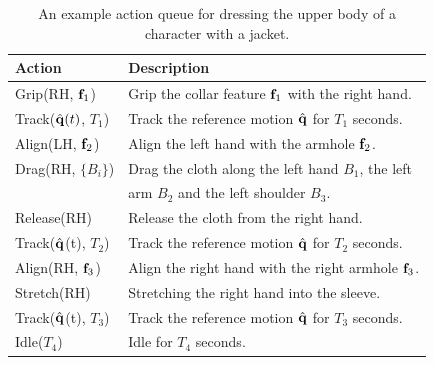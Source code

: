 \begin{table}
  \centering
  \begin{tabular}{|l|l|}
    \hline
    Action & Description \\
    \hline
    Grip(RH, $\mathbf{f}_{1}$) & Grip the collar feature $\mathbf{f}_1$  with the right hand.\\
    Track($\hat{\mathbf{q}}(t)$, $T_1$) & Track the reference motion $\hat{\mathbf{q}}$ for $T_1$ seconds.\\
    Align(LH, $\mathbf{f}_{2}$) & Align the left hand with the armhole $\mathbf{f}_2$.\\
    Drag(RH, $\{B_i\}$) & Drag the cloth along the left hand $B_1$, the left\\
    &                      arm $B_2$ and the left shoulder $B_3$.\\
    Release(RH) & Release the cloth from the right hand.\\
    Track($\hat{\mathbf{q}}$(t), $T_2$) & Track the reference motion $\hat{\mathbf{q}}$ for $T_2$ seconds.\\
    Align(RH, $\mathbf{f}_{3}$) & Align the right hand with the right armhole $\mathbf{f}_3$.\\
    Stretch(RH) & Stretching the right hand into the sleeve.\\
    Track($\hat{\mathbf{q}}$(t), $T_3$) & Track the reference motion $\hat{\mathbf{q}}$ for $T_3$ seconds. \\
    Idle($T_4$) & Idle for $T_4$ seconds.\\
    \hline
  \end{tabular}
  \caption{An example action queue for dressing the upper body of a character with a jacket.}
  \label{table:actionQueue}
\end{table}


